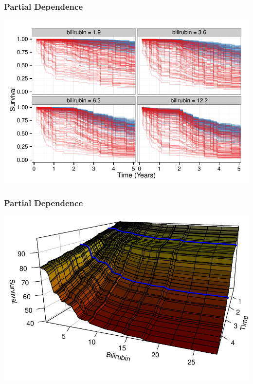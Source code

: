 \documentclass[xcolor=svgnames]{beamer}\usepackage[]{graphicx}\usepackage[]{color}
\newenvironment{knitrout}{}{} %
\begin{document}
\begin{frame}
\frametitle{Partial Dependence}

\begin{knitrout}\footnotesize
{}\color{fgcolor}

{\centering \includegraphics[width=.9\linewidth]{figures/rfs-nomo2-1} 

}



\end{knitrout}
\end{frame}

\begin{frame}
\frametitle{Partial Dependence}

\begin{knitrout}\footnotesize
{}\color{fgcolor}

{\centering \includegraphics[width=.9\linewidth]{figures/pbc-timeSurface-1} 

}



\end{knitrout}
\end{frame}
\end{document}
